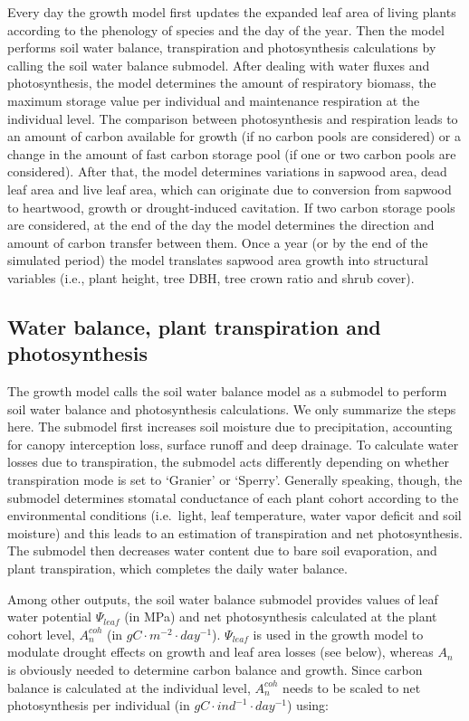 \documentclass[]{book}
\begin{document}
Every day the growth model first updates the expanded leaf area of
living plants according to the phenology of species and the day of the
year. Then the model performs soil water balance, transpiration and
photosynthesis calculations by calling the soil water balance submodel.
After dealing with water fluxes and photosynthesis, the model determines
the amount of respiratory biomass, the maximum storage value per
individual and maintenance respiration at the individual level. The
comparison between photosynthesis and respiration leads to an amount of
carbon available for growth (if no carbon pools are considered) or a
change in the amount of fast carbon storage pool (if one or two carbon
pools are considered). After that, the model determines variations in
sapwood area, dead leaf area and live leaf area, which can originate due
to conversion from sapwood to heartwood, growth or drought-induced
cavitation. If two carbon storage pools are considered, at the end of
the day the model determines the direction and amount of carbon transfer
between them. Once a year (or by the end of the simulated period) the
model translates sapwood area growth into structural variables (i.e.,
plant height, tree DBH, tree crown ratio and shrub cover).

\subsection{Water balance, plant transpiration and
photosynthesis}\label{water-balance-plant-transpiration-and-photosynthesis}

The growth model calls the soil water balance model as a submodel to
perform soil water balance and photosynthesis calculations. We only
summarize the steps here. The submodel first increases soil moisture due
to precipitation, accounting for canopy interception loss, surface
runoff and deep drainage. To calculate water losses due to
transpiration, the submodel acts differently depending on whether
transpiration mode is set to `Granier' or `Sperry'. Generally speaking,
though, the submodel determines stomatal conductance of each plant
cohort according to the environmental conditions (i.e.~light, leaf
temperature, water vapor deficit and soil moisture) and this leads to an
estimation of transpiration and net photosynthesis. The submodel then
decreases water content due to bare soil evaporation, and plant
transpiration, which completes the daily water balance.

Among other outputs, the soil water balance submodel provides values of
leaf water potential \(\Psi_{leaf}\) (in MPa) and net photosynthesis
calculated at the plant cohort level, \(A_n^{coh}\) (in
\(g C · m^{-2} · day^{-1}\)). \(\Psi_{leaf}\) is used in the growth
model to modulate drought effects on growth and leaf area losses (see
below), whereas \(A_n\) is obviously needed to determine carbon balance
and growth. Since carbon balance is calculated at the individual level,
\(A_n^{coh}\) needs to be scaled to net photosynthesis per individual
(in \(g C · ind^{-1} · day^{-1}\)) using:
\end{document}
